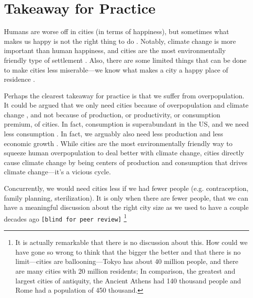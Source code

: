 \documentclass[10pt, letterpaper]{article}
\begin{document}
\section{Takeaway for Practice}
Humans are worse off in cities (in terms of happiness), but sometimes what
makes us happy is not the right thing to do \citep{linden11,haybron08,nussbaum05}. Notably,
climate change is more important than human happiness, and cities are the most
environmentally friendly type of settlement \citep{meyer13}. Also, there are some limited
things that can be done to make cities less miserable---we know what makes a city a
happy place of residence \citep{ballas13}.

Perhaps the clearest takeaway for practice is that we suffer from overpopulation. It could be argued that we only need cities because of overpopulation and climate change \citep{pachauri14}, and not because of production, or productivity, or consumption premium, of cities. In fact, consumption is superabundant in the US, and we need less consumption
\citep{dittmar14,kasser13,leonard10}. In fact, we arguably also need less production and less economic growth \citep{kallis12,kallis11,bergh11}. While cities are the most environmentally friendly way to squeeze human overpopulation %
to deal better with climate change, cities directly cause climate change by being centers of production and consumption that drives climate change---it's a vicious cycle.  

Concurrently, we would need cities less if we had fewer people (e.g. contraception, family planning, sterilization). It is only when there are fewer people, that we can have a meaningful discussion about the right city size as we used to have a couple decades ago
\texttt{[blind for peer review]} 
\footnote{It is actually remarkable that there is no discussion about this. How could we have gone so wrong to think that the bigger the better and that there is no limit---cities are ballooning---Tokyo has about 40 million people, and there are many cities with 20 million residents; In comparison, the greatest and largest cities of antiquity, the Ancient Athens had 140 thousand people and Rome had a population of 450 thousand.} 

\end{document}
